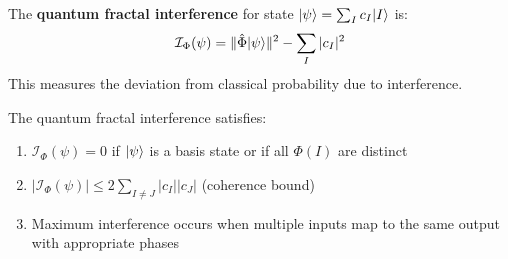 \begin{definition}
\label{def:quantum-interference}
The \textbf{quantum fractal interference} for state $|\psi\rangle = \sum_I c_I |I\rangle$ is:
\[
\mathcal{I}_\Phi(\psi) = \|\hat{\Phi}|\psi\rangle\|^2 - \sum_I |c_I|^2
\]
This measures the deviation from classical probability due to interference.
\end{definition}

\begin{proposition}
\label{prop:interference-bounds}
The quantum fractal interference satisfies:
\begin{enumerate}
  \item $\mathcal{I}_\Phi(\psi) = 0$ if $|\psi\rangle$ is a basis state or if all $\Phi(I)$ are distinct
  \item $|\mathcal{I}_\Phi(\psi)| \leq 2\sum_{I \neq J} |c_I||c_J|$ (coherence bound)
  \item Maximum interference occurs when multiple inputs map to the same output with appropriate phases
\end{enumerate}
\end{proposition}

